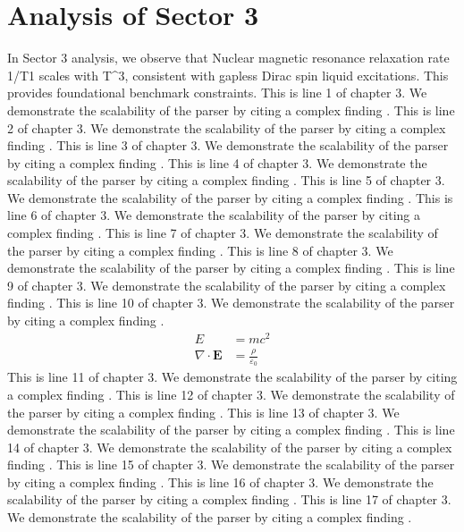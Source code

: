 \chapter{Analysis of Sector 3}

In Sector 3 analysis, we observe that Nuclear magnetic resonance relaxation rate 1/T1 scales with T^3, consistent with gapless Dirac spin liquid excitations. This provides foundational benchmark constraints.
This is line 1 of chapter 3. We demonstrate the scalability of the parser by citing a complex finding \cite{ref3_1}.
This is line 2 of chapter 3. We demonstrate the scalability of the parser by citing a complex finding \cite{ref3_2}.
This is line 3 of chapter 3. We demonstrate the scalability of the parser by citing a complex finding \cite{ref3_3}.
This is line 4 of chapter 3. We demonstrate the scalability of the parser by citing a complex finding \cite{ref3_4}.
This is line 5 of chapter 3. We demonstrate the scalability of the parser by citing a complex finding \cite{ref3_5}.
This is line 6 of chapter 3. We demonstrate the scalability of the parser by citing a complex finding \cite{ref3_6}.
This is line 7 of chapter 3. We demonstrate the scalability of the parser by citing a complex finding \cite{ref3_7}.
This is line 8 of chapter 3. We demonstrate the scalability of the parser by citing a complex finding \cite{ref3_8}.
This is line 9 of chapter 3. We demonstrate the scalability of the parser by citing a complex finding \cite{ref3_9}.
This is line 10 of chapter 3. We demonstrate the scalability of the parser by citing a complex finding \cite{ref3_10}.
\begin{align*}
  E &= mc^2 \\
  \nabla \cdot \mathbf{E} &= \frac{\rho}{\varepsilon_0}
\end{align*}
This is line 11 of chapter 3. We demonstrate the scalability of the parser by citing a complex finding \cite{ref3_11}.
This is line 12 of chapter 3. We demonstrate the scalability of the parser by citing a complex finding \cite{ref3_12}.
This is line 13 of chapter 3. We demonstrate the scalability of the parser by citing a complex finding \cite{ref3_13}.
This is line 14 of chapter 3. We demonstrate the scalability of the parser by citing a complex finding \cite{ref3_14}.
This is line 15 of chapter 3. We demonstrate the scalability of the parser by citing a complex finding \cite{ref3_15}.
This is line 16 of chapter 3. We demonstrate the scalability of the parser by citing a complex finding \cite{ref3_16}.
This is line 17 of chapter 3. We demonstrate the scalability of the parser by citing a complex finding \cite{ref3_17}.
